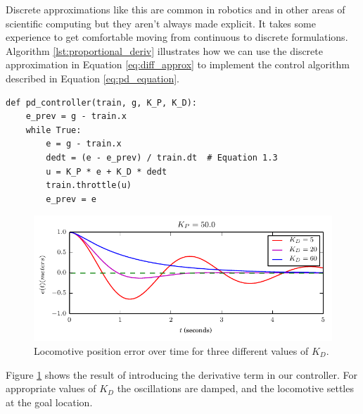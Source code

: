 



Discrete approximations like this are common in robotics and in
other areas of scientific computing but they aren't always made
explicit.  It takes some experience to get comfortable moving from
continuous to discrete formulations. Algorithm
\ref{lst:proportional_deriv} illustrates how we can use the discrete
approximation in Equation \ref{eq:diff_approx} to implement the
control algorithm described in Equation \ref{eq:pd_equation}. 


\begin{minipage}[c]{0.95\textwidth}
\begin{lstlisting}[label={lst:proportional_deriv},caption={Proportional Derivative Control Algorithm}]
def pd_controller(train, g, K_P, K_D):
    e_prev = g - train.x
    while True:
        e = g - train.x
        dedt = (e - e_prev) / train.dt  # Equation 1.3
        u = K_P * e + K_D * dedt
        train.throttle(u)
        e_prev = e
\end{lstlisting}
\end{minipage}


\begin{figure}
\includegraphics{pid/figs/pd_result.pdf}
\caption{Locomotive position error over time for three different
  values of $K_D$.}
\label{fig:pd_result}
\end{figure}

Figure \ref{fig:pd_result} shows the result of introducing the derivative term in our
controller.  For appropriate values of $K_D$ the oscillations are
damped, and the locomotive settles at the goal location.

